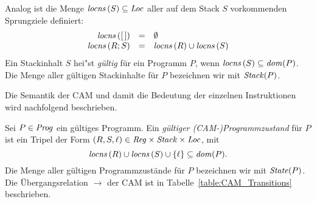 \documentclass[12pt,fleqn,a4paper]{article}
\begin{document}
\begin{definition}
  Analog ist die Menge ${\text{\it locns\/}}\,(S) \subseteq {\text{\it Loc\/}}$ aller auf dem Stack $S$ vorkommenden Sprungziele definiert:
  \[\begin{array}{rcl}
    {\text{\it locns\/}}\,([\,]) &=& \emptyset \\
    {\text{\it locns\/}}\,(R;S) &=& {\text{\it locns\/}}\,(R) \cup {\text{\it locns\/}}\,(S)
  \end{array}\]
  Ein Stackinhalt $S$ hei"st {\em g\"ultig} f\"ur ein Programm $P$, wenn ${\text{\it locns\/}}\,(S)\subseteq{\text{\it dom\/}}(P)$. Die Menge
  aller g\"ultigen Stackinhalte f\"ur $P$ bezeichnen wir mit ${\text{\it Stack\/}}(P)$.
\end{definition}

Die Semantik der CAM und damit die Bedeutung der einzelnen Instruktionen wird nachfolgend beschrieben.

\begin{definition}
  Sei $P\in{\text{\it Prog\/}}$ ein g\"ultiges Programm. Ein {\em g\"ultiger (CAM-)Programmzustand} f\"ur $P$ ist ein Tripel der Form
  $(R,S,\ell) \in {\text{\it Reg\/}} \times {\text{\it Stack\/}} \times {\text{\it Loc\/}}$, mit
  \[
  {\text{\it locns\/}}\,(R)\cup{\text{\it locns\/}}\,(S)\cup\{\ell\}\subseteq{\text{\it dom\/}}(P).
  \]
  Die Menge aller g\"ultigen Programmzust\"ande f\"ur $P$ bezeichnen wir mit ${\text{\it State\/}}(P)$.
  Die \"Ubergangsrelation $\to$ der CAM ist in Tabelle~\ref{table:CAM_Transitions} beschrieben.
\end{definition}
\end{document}
